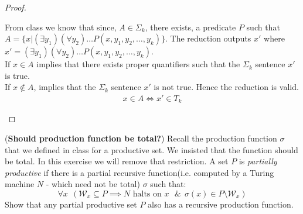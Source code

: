 \documentclass[solution,addpoints,12pt]{exam}
\begin{document}
\begin{questions}
\begin{solution}
\begin{parts}
\begin{proof}
\begin{itemize}
				\par
				From class we know that since, $A \in \Sigma_k$, there exists, a predicate $P$ such that $A = \{x | (\exists y_1)(\forall y_2)\ldots P(x,y_1,y_2,\ldots,y_k)\}$. The reduction outputs $x'$ where $x' = (\exists y_1)(\forall y_2)\ldots P(x,y_1,y_2,\ldots,y_k)$.
				\\
				If $x \in A$ implies that there exists proper quantifiers such that the $\Sigma_k$ sentence $x'$ is true.
				\\
				If $x \not \in A$, implies that the $\Sigma_k$ sentence $x'$ is not true.
				Hence the reduction is valid.
					\begin{align*}
					x \in A \iff x' \in T_{k}
					\end{align*}
			\end{itemize} 
		\end{proof}
	\end{parts}
\end{solution}
\question[7] (\textbf{Should production function be total?})
Recall the production function $\sigma$ that we defined in class for a productive set. We insisted that the function should be total. In this exercise we will remove that restriction. A set $P$ is \textit{partially productive} if there is a partial recursive function(i.e. computed by a Turing machine $N$ - which need not be total) $\sigma$ such that:
\[ \forall x ~~\left( \mathcal{W}_x \subseteq P \implies N \textrm{ halts on $x$ } 
\&~~\sigma(x) \in P \setminus \mathcal{W}_x \right) \]
Show that any partial productive set $P$ also has a recursive production function.


\end{questions}
\end{document}
